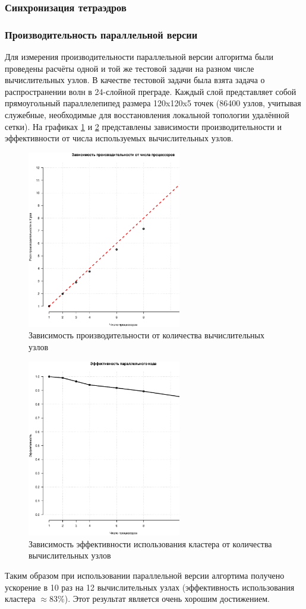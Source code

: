 \subsubsection{Синхронизация тетраэдров}
\subsubsection{Производительность параллельной версии}
Для измерения производительности параллельной версии алгоритма были проведены расчёты одной и той же тестовой задачи на разном числе вычислительных узлов. В качестве тестовой задачи была взята задача о распространении волн в 24-слойной преграде. Каждый слой представляет собой прямоугольный параллелепипед размера 120x120x5 точек (86400 узлов, учитывая служебные, необходимые для восстановления локальной топологии удалённой сетки). На графиках \ref{pic:gcm_boost} и \ref{pic:gcm_efficiency} представлены зависимости производительности и эффективности от числа используемых вычислительных узлов.
\begin{figure}[htp]
\centering
\includegraphics[width=0.6\textwidth]{eps/gcm3d-boost.eps}
\caption{Зависимость производительности от количества вычислительных узлов}
\label{pic:gcm_boost}
\end{figure}
\begin{figure}[htp]
\centering
\includegraphics[width=0.6\textwidth]{eps/gcm3d-efficiency.eps}
\caption{Зависимость эффективности использования кластера от количества вычислительных узлов}
\label{pic:gcm_efficiency}
\end{figure}
Таким образом при использовании параллельной версии алгортима получено ускорение в 10 раз на 12 вычислительных узлах (эффективность использования кластера $\approx 83\%$). Этот результат является очень хорошим достижением.